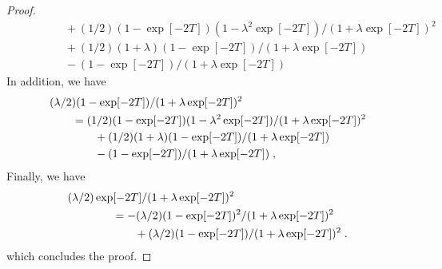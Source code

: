 \begin{proof}
\begin{align}
   & \qquad \qquad  +(1/2)(1- \exp[-2T])(1 - \lambda^2 \exp[-2T])/(1 + \lambda \exp[-2T])^2 \\ 
      & \qquad \qquad + (1/2)(1+\lambda)  (1 -  \exp[-2T])/(1 + \lambda \exp[-2T]) \\
     & \qquad \qquad  -  (1 -  \exp[-2T])/(1 + \lambda \exp[-2T])
\end{align}
In addition, we have
\begin{align}
  & (\lambda/2) (1 - \exp[-2T])/(1 + \lambda \exp[-2T])^2 \\
  &\qquad = (1/2)(1- \exp[-2T])(1 - \lambda^2 \exp[-2T])/(1 + \lambda \exp[-2T])^2 \\ 
      & \qquad \qquad + (1/2)(1+\lambda)  (1 -  \exp[-2T])/(1 + \lambda \exp[-2T]) \\
     & \qquad \qquad  -  (1 -  \exp[-2T])/(1 + \lambda \exp[-2T]) \; ,
\end{align}
Finally, we have
\begin{align}
  &(\lambda/2)\exp[-2T]/(1 + \lambda \exp[-2T])^2 \\
    & \qquad \qquad = -(\lambda/2)(1-\exp[-2T])^2/(1 + \lambda \exp[-2T])^2 \\
    & \qquad \qquad \qquad + (\lambda/2) (1 - \exp[-2T])/(1 + \lambda \exp[-2T])^2 \; .
\end{align}
which concludes the proof.

\end{proof}

